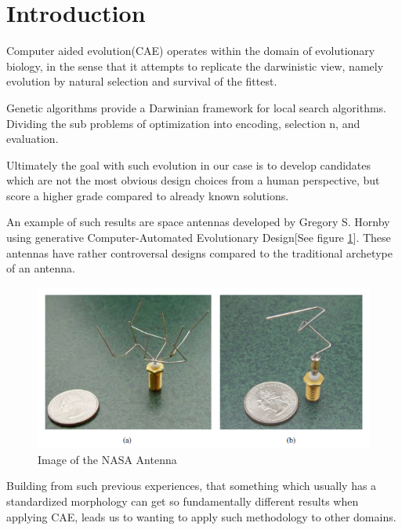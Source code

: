 \section{Introduction}
Computer aided evolution(CAE) operates within the domain of evolutionary
biology, in the sense that it attempts to replicate the darwinistic view, namely
evolution by natural selection and survival of the fittest\cite{paper:ev3}.

Genetic algorithms provide a Darwinian framework for local search algorithms.
Dividing the sub problems of optimization into encoding, selection n, and
evaluation\cite{paper:ev3}. 

Ultimately the goal with such evolution in our case is to develop candidates
which are not the most obvious design choices from a human perspective, but
score a higher grade compared to already known solutions.

 An example
of such results are space antennas developed by Gregory S.
Hornby\cite{paper:ev4} using generative Computer-Automated Evolutionary
Design[See figure \ref{fig:nasa_antenna}]. These antennas have rather
controversal designs compared to the traditional archetype of an antenna.

\begin{figure}[ht] \includegraphics[scale=.7]{content/img/space_antenna}
\caption{Image of the NASA Antenna \cite{paper:ev4} } \label{fig:nasa_antenna}
\end{figure}

Building from such previous experiences, that something which usually has a
standardized morphology can get so fundamentally different results when applying
CAE, leads us to wanting to apply such methodology to other domains.

